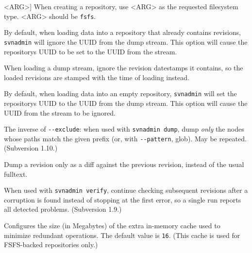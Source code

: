 \begin{description}
\textless ARG\textgreater{}]
When creating a repository, use \textless ARG\textgreater{} as the
requested filesystem type. \textless ARG\textgreater{} should be
\texttt{fsfs}.
\item[\protect\phantomsection\label{svn.ref.svnadmin.sw.force_uuid}{}\texttt{-\/-force-uuid}]
By default, when loading data into a repository that already contains
revisions, \texttt{svnadmin} will ignore the UUID from the dump stream.
This option will cause the repository\textquotesingle s UUID to be set
to the UUID from the stream.
\item[\protect\phantomsection\label{svn.ref.svnadmin.sw.ignore_dates}{}\texttt{-\/-ignore-dates}]
When loading a dump stream, ignore the revision datestamps it contains,
so the loaded revisions are stamped with the time of loading instead.
\item[\protect\phantomsection\label{svn.ref.svnadmin.sw.ignore_uuid}{}\texttt{-\/-ignore-uuid}]
By default, when loading data into an empty repository,
\texttt{svnadmin} will set the repository\textquotesingle s UUID to the
UUID from the dump stream. This option will cause the UUID from the
stream to be ignored.
\item[\protect\phantomsection\label{svn.ref.svnadmin.sw.include}{}\texttt{-\/-include}
\textless ARG\textgreater{}]
The inverse of \texttt{-\/-exclude}: when used with
\texttt{svnadmin\ dump}, dump \emph{only} the nodes whose paths match the
given prefix (or, with \texttt{-\/-pattern}, glob). May be repeated.
(Subversion 1.10.)
\item[\protect\phantomsection\label{svn.ref.svnadmin.sw.incremental}{}\texttt{-\/-incremental}]
Dump a revision only as a diff against the previous revision, instead of
the usual fulltext.
\item[\protect\phantomsection\label{svn.ref.svnadmin.sw.keep_going}{}\texttt{-\/-keep-going}]
When used with \texttt{svnadmin\ verify}, continue checking subsequent
revisions after a corruption is found instead of stopping at the first
error, so a single run reports all detected problems. (Subversion 1.9.)
\item[\protect\phantomsection\label{svn.ref.svnadmin.sw.memory_cache_size}{}\texttt{-\/-memory-cache-size}
(\texttt{-M}) \textless ARG\textgreater{}]
Configures the size (in Megabytes) of the extra in-memory cache used to
minimize redundant operations. The default value is \texttt{16}. (This
cache is used for FSFS-backed repositories only.)
\item[\protect\phantomsection\label{svn.ref.svnadmin.sw.metadata_only}{}\texttt{-\/-metadata-only}]

\end{description}
